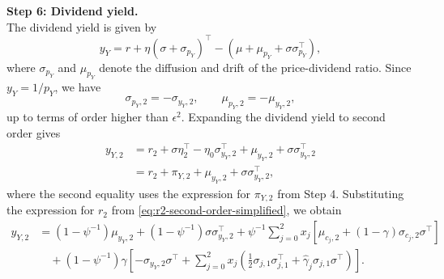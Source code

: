 
\noindent\textbf{Step 6: Dividend yield.}\\
The dividend yield is given by
\begin{equation}
    y_Y = r + \eta (\sigma + \sigma_{p_Y})^\top - \left(\mu + \mu_{p_Y} + \sigma \sigma_{p_Y}^\top\right),        
\end{equation}
where $\sigma_{p_Y}$ and $\mu_{p_Y}$ denote the diffusion and drift of the price-dividend ratio.
Since $y_Y=1/p_Y$, we have
\begin{equation}
    \sigma_{p_Y,2}=-\sigma_{y_Y,2}, \qquad \mu_{p_Y,2}=-\mu_{y_Y,2},
\end{equation}
up to terms of order higher than $\epsilon^2$.
Expanding the dividend yield to second order gives
\begin{align}\label{eq:y2-pricing-condition}
    y_{Y,2}
    &= r_2 + \sigma \eta_2^\top - \eta_0\sigma_{y_Y,2}^\top
    + \mu_{y_Y,2} + \sigma\sigma_{y_Y,2}^\top \\
    &= r_2 + \pi_{Y,2} + \mu_{y_Y,2} + \sigma\sigma_{y_Y,2}^\top,
\end{align}
where the second equality uses the expression for $\pi_{Y,2}$ from Step 4.
Substituting the expression for $r_2$ from \eqref{eq:r2-second-order-simplified}, we obtain
\begin{align}\label{eq:y2-second-order-general}
    y_{Y,2}
    &= (1-\psi^{-1})\mu_{y_Y,2}
    +(1-\psi^{-1})\sigma\sigma_{y_Y,2}^\top
    + \psi^{-1}\sum_{j=0}^2 x_j\left[\mu_{c_j,2} + (1-\gamma)\sigma_{c_j,2}\sigma^\top\right] \nonumber\\
    &\quad + (1-\psi^{-1})\gamma \left[-\sigma_{y_Y,2}\sigma^\top
        + \sum_{j=0}^2 x_j \left(
        \frac{1}{2}\sigma_{j,1}\sigma_{j,1}^\top
        + \hat{\gamma}_j \sigma_{j,1}\sigma^\top
    \right)\right].
\end{align}
